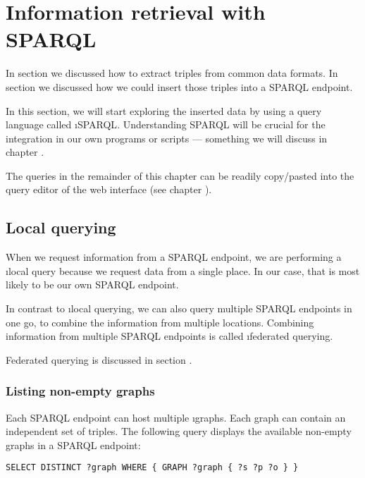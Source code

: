 \chapter{Information retrieval with SPARQL}
\label{chap:information-retrieval}

  In section  we discussed how to extract triples from
  common data formats.  In section  we discussed how we
  could insert those triples into a SPARQL endpoint.

  In this section, we will start exploring the inserted data by using a
  query language called \i{SPARQL}.  Understanding SPARQL will be crucial
  for the integration in our own programs or scripts --- something we will
  discuss in chapter .

  The queries in the remainder of this chapter can be readily copy/pasted into
  the query editor of the web interface (see chapter
  ).

\section{Local querying}

  When we request information from a SPARQL endpoint, we are performing a
  \i{local query} because we request data from a single place.  In our case,
  that is most likely to be our own SPARQL endpoint.

  In contrast to \i{local querying}, we can also query multiple SPARQL
  endpoints in one go, to combine the information from multiple locations.
  Combining information from multiple SPARQL endpoints is called \i{federated
    querying}.

  Federated querying is discussed in section .

\subsection{Listing non-empty graphs}
\label{sec:non-empty-graphs}
  Each SPARQL endpoint can host multiple \i{graphs}.  Each graph can contain
  an independent set of triples.  The following query displays the available
  non-empty graphs in a SPARQL endpoint:

\begin{siderules}
\begin{verbatim}
SELECT DISTINCT ?graph WHERE { GRAPH ?graph { ?s ?p ?o } }
\end{verbatim}
\end{siderules}

